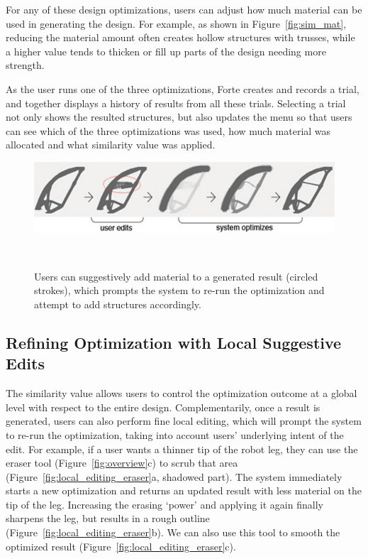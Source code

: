 For any of these design optimizations, users can adjust how much material can be used in generating the design. For example, as shown in Figure~\ref{fig:sim_mat}, reducing the material amount often creates hollow structures with trusses, while a higher value tends to thicken or fill up parts of the design needing more strength.


As the user runs one of the three optimizations, Forte creates and records a trial, and together displays a history of results from all these trials. Selecting a trial not only shows the resulted structures, but also updates the menu so that users can see which of the three optimizations was used, how much material was allocated and what similarity value was applied.


\begin{figure} [b]
  \centering
  \includegraphics[width=0.75\columnwidth]{figures/local_editing_pencil}
  \caption{Users can suggestively add material to a generated result (circled strokes), which prompts the system to re-run the optimization and attempt to add structures accordingly.}~\label{fig:local_editing_pencil}
\end{figure}

\subsection{Refining Optimization with Local Suggestive Edits}
The similarity value allows users to control the optimization outcome at a global level with respect to the entire design. Complementarily, once a result is generated, users can also perform fine local editing, which will prompt the system to re-run the optimization, taking into account users' underlying intent of the edit. For example, if a user wants a thinner tip of the robot leg, they can use the eraser tool (Figure~\ref{fig:overview}c) to scrub that area (Figure~\ref{fig:local_editing_eraser}a, shadowed part). The system immediately starts a new optimization and returns an updated result with less material on the tip of the leg. Increasing the erasing `power' and applying it again finally sharpens the leg, but results in a rough outline (Figure~\ref{fig:local_editing_eraser}b). We can also use this tool to smooth the optimized result (Figure~\ref{fig:local_editing_eraser}c).

